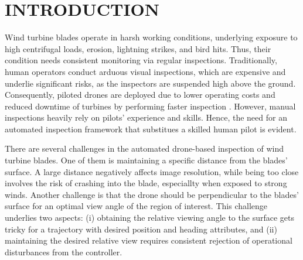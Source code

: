 \documentclass[letterpaper, 10 pt, conference]{ieeeconf}  %
\begin{document}
\section{INTRODUCTION}




Wind turbine blades operate in harsh working conditions, underlying exposure to high centrifugal loads, erosion, lightning strikes, and bird hits. Thus, their condition needs consistent monitoring via regular inspections. Traditionally, human operators conduct arduous visual inspections, which are expensive and underlie significant risks, as the inspectors are suspended high above the ground. Consequently, piloted drones are deployed due to lower operating costs and reduced downtime of turbines by performing faster inspection \cite{NLR}. However, manual inspections heavily rely on pilots' experience and skills. Hence, the need for an automated inspection framework that substitues a skilled human pilot is evident.

There are several challenges in the automated drone-based inspection of wind turbine blades. One of them is maintaining a specific distance from the blades’ surface. A large distance negatively affects image resolution, while being too close involves the risk of crashing into the blade, especiallty when exposed to strong winds.
Another challenge is that the drone should be perpendicular to the blades’ surface for an optimal view angle of the region of interest. This challenge underlies two aspects: (i) obtaining the relative viewing angle to the surface gets tricky for a trajectory with desired position and heading attributes, and (ii) maintaining the desired relative view requires consistent rejection of operational disturbances from the controller.
\end{document}
